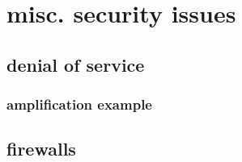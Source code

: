 \section{misc. security issues}

\subsection{denial of service}


\subsubsection{amplification example}

\subsection{firewalls} %

